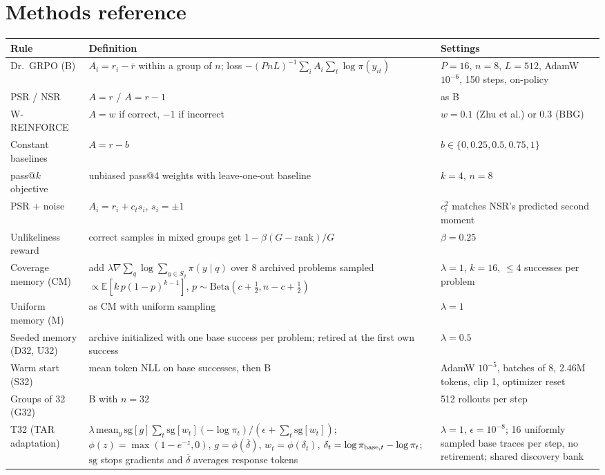 \documentclass[11pt]{article}
\newcommand{\E}{\mathbb{E}}
\begin{document}
\section{Methods reference}\label{app:methods}
\small
\begin{longtable}{@{}P{3.0cm}P{6.2cm}P{4.6cm}@{}}
\toprule
\textbf{Rule} & \textbf{Definition} & \textbf{Settings}\\
\midrule
\endhead
Dr.\ GRPO (B) & $A_i=r_i-\bar r$ within a group of $n$; loss $-(PnL)^{-1}\sum_iA_i\sum_t\log\pi(y_{it})$ & $P=16$, $n=8$, $L=512$, AdamW $10^{-6}$, 150 steps, on-policy\\
PSR / NSR & $A=r$ / $A=r-1$ & as B\\
W-REINFORCE & $A=w$ if correct, $-1$ if incorrect & $w=0.1$ (Zhu et al.) or $0.3$ (BBG)\\
Constant baselines & $A=r-b$ & $b\in\{0,0.25,0.5,0.75,1\}$\\
pass@$k$ objective & unbiased pass@4 weights with leave-one-out baseline & $k=4$, $n=8$\\
PSR + noise & $A_i=r_i+c_ts_i$, $s_i=\pm1$ & $c_t^2$ matches NSR's predicted second moment\\
Unlikeliness reward & correct samples in mixed groups get $1-\beta(G-\mathrm{rank})/G$ & $\beta=0.25$\\
Coverage memory (CM) & add $\lambda\nabla\sum_q\log\sum_{y\in S_q}\pi(y\mid q)$ over 8 archived problems sampled $\propto\E[k\,p(1-p)^{k-1}]$, $p\sim\mathrm{Beta}(c+\frac12,n-c+\frac12)$ & $\lambda=1$, $k=16$, $\le4$ successes per problem\\
Uniform memory (M) & as CM with uniform sampling & $\lambda=1$\\
Seeded memory (D32, U32) & archive initialized with one base success per problem; retired at the first own success & $\lambda=0.5$\\
Warm start (S32) & mean token NLL on base successes, then B & AdamW $10^{-5}$, batches of 8, 2.46M tokens, clip 1, optimizer reset\\
Groups of 32 (G32) & B with $n=32$ & 512 rollouts per step\\
T32 (TAR adaptation) & $\lambda\,\mathrm{mean}_{y}\,\mathrm{sg}[g]\sum_t\mathrm{sg}[w_t](-\log\pi_t)/(\epsilon+\sum_t\mathrm{sg}[w_t])$; $\phi(z)=\max(1-e^{-z},0)$, $g=\phi(\overline{\delta})$, $w_t=\phi(\delta_t)$, $\delta_t=\log\pi_{{\rm base},t}-\log\pi_t$; $\mathrm{sg}$ stops gradients and $\overline{\delta}$ averages response tokens & $\lambda=1$, $\epsilon=10^{-8}$; 16 uniformly sampled base traces per step, no retirement; shared discovery bank\\

\end{longtable}
\end{document}

